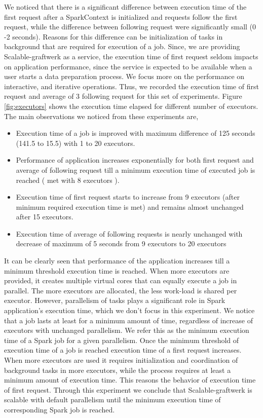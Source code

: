 We noticed that there is a significant difference between execution time of the first request after a SparkContext is initialized and requests follow the first request, while the difference between following request were significantly small (0 -2 seconds). Reasons for this difference can be initialization of tasks in background that are required for execution of a job. Since, we are providing Scalable-graftwerk as a service, the execution time of first request seldom impacts on application performance, since the service is expected to be available when a user starts a data preparation process. We focus more on the performance on interactive, and iterative operations. Thus, we recorded the execution time of first request and average of 3 following request for this set of experiments. Figure \ref{fig:executors} shows the execution time elapsed for different number of executors. The main observations we noticed from these experiments are, 
\begin{itemize}
\item Execution time of a job is improved with maximum difference of 125 seconds (141.5 to 15.5) with 1 to 20 executors. 
\item Performance of application increases exponentially for both first request and average of following request till a minimum execution time of executed job is reached ( met with 8 executors ).  
\item Execution time of first request starts to increase from 9 executors (after minimum required execution time is met) and remains almost unchanged after 15 executors.
\item Execution time of average of following requests is nearly unchanged with decrease of maximum of 5 seconds from 9 executors to 20 executors
\end{itemize}
It can be clearly seen that performance of the application increases till a minimum threshold execution time is reached. When more executors are provided, it creates multiple virtual cores that can equally execute a job in parallel. The more executors are allocated, the less work-load is shared per executor. However, parallelism of tasks plays a significant role in Spark application's execution time, which we don't focus in this experiment. We notice that a job lasts at least for a minimum amount of time, regardless of increase of executors with unchanged parallelism. We refer this as the minimum execution time of a Spark job for a given parallelism. Once the minimum threshold of execution time of a job is reached execution time of a first request increases. When more executors are used it requires initialization and coordination of background tasks in more executors, while the process requires at least a minimum amount of execution time. This reasons the behavior of execution time of first request. Through this experiment we conclude that Scalable-graftwerk is scalable with default parallelism until the minimum execution time of corresponding Spark job is reached. 
 
